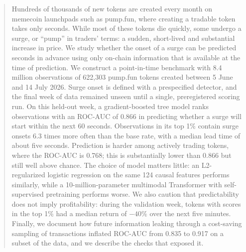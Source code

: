 \begin{abstract}
Hundreds of thousands of new tokens are created every month on memecoin launchpads such as pump.fun, where creating a tradable token takes only seconds. While most of these tokens die quickly, some undergo a surge, or ``pump'' in traders' terms: a sudden, short-lived and substantial increase in price. We study whether the onset of a surge can be predicted seconds in advance using only on-chain information that is available at the time of prediction. We construct a point-in-time benchmark with 8.4 million observations of 622,303 pump.fun tokens created between 5 June and 14 July 2026. Surge onset is defined with a prespecified detector, and the final week of data remained unseen until a single, preregistered scoring run. On this held-out week, a gradient-boosted tree model ranks observations with an ROC-AUC of 0.866 in predicting whether a surge will start within the next 60 seconds. Observations in its top 1\% contain surge onsets 6.3 times more often than the base rate, with a median lead time of about five seconds. Prediction is harder among actively trading tokens, where the ROC-AUC is 0.768; this is substantially lower than 0.866 but still well above chance. The choice of model matters little: an L2-regularized logistic regression on the same 124 causal features performs similarly, while a 10-million-parameter multimodal Transformer with self-supervised pretraining performs worse. We also caution that predictability does not imply profitability: during the validation week, tokens with scores in the top 1\% had a median return of $-40\%$ over the next five minutes. Finally, we document how future information leaking through a cost-saving sampling of transactions inflated ROC-AUC from 0.835 to 0.917 on a subset of the data, and we describe the checks that exposed it.
\end{abstract}
